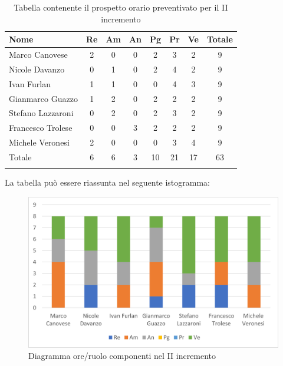 \begin{longtable}{|l|c|c|c|c|c|c|c|}
	\hline
	\rowcolor{lighter-grayer}
	\textbf{Nome}     & \textbf{Re} & \textbf{Am} & \textbf{An} & \textbf{Pg} & \textbf{Pr} & \textbf{Ve} & \textbf{Totale} \\
	\hline
	\endfirsthead

	\hline
	Marco Canovese    & 2           & 0           & 0           & 2           & 3           & 2           & 9               \\
	\hline
	\hline
	Nicole Davanzo    & 0           & 1           & 0           & 2           & 4           & 2           & 9               \\
	\hline
	\hline
	Ivan Furlan       & 1           & 1           & 0           & 0           & 4           & 3           & 9               \\
	\hline
	\hline
	Gianmarco Guazzo  & 1           & 2           & 0           & 2           & 2           & 2           & 9               \\
	\hline
	\hline
	Stefano Lazzaroni & 0           & 2           & 0           & 2           & 3           & 2           & 9               \\
	\hline
	\hline
	Francesco Trolese & 0           & 0           & 3           & 2           & 2           & 2           & 9               \\
	\hline
	\hline
	Michele Veronesi  & 2           & 0           & 0           & 0           & 3           & 4           & 9               \\
	\hline
	\hline
	Totale            & 6           & 6          & 3          & 10           & 21           & 17          & 63              \\
	\hline
	\rowcolor{white}
	\caption{Tabella contenente il prospetto orario preventivato per il II incremento}
\end{longtable}


La tabella può essere riassunta nel seguente istogramma:

\begin{figure}[H]
	\centering
	\includegraphics[width=0.8\linewidth]{res/images/preventivo/dettaglio_analisi/2-1.png}
	\caption{Diagramma ore/ruolo componenti nel II incremento}
	\label{fig:diagramma suddivisione ruoli II incremento}
\end{figure}


